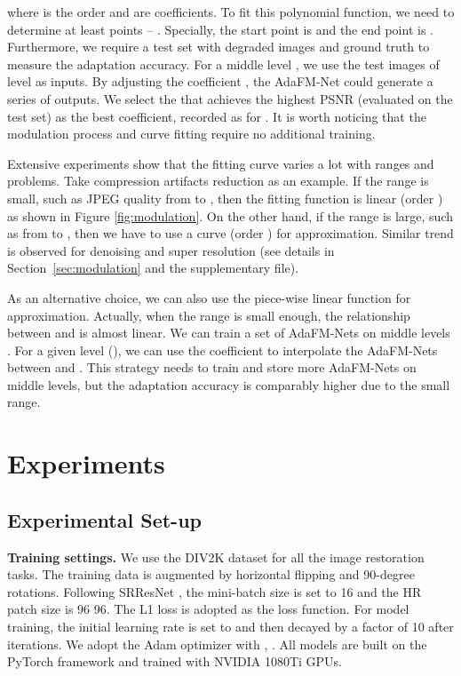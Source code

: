 \documentclass[10pt,twocolumn,letterpaper]{article}
\begin{document}
where  is the order and  are coefficients. To fit this polynomial function, we need to determine at least  points – . Specially, the start point is  and the end point is . Furthermore, we require a test set with degraded images and ground truth to measure the adaptation accuracy. For a middle level  , we use the test images of level  as inputs. By adjusting the coefficient , the AdaFM-Net could generate a series of outputs. We select the  that achieves the highest PSNR (evaluated on the test set) as the best coefficient, recorded as  for . It is worth noticing that the modulation process and curve fitting require no additional training.

Extensive experiments show that the fitting curve varies a lot with ranges and problems. Take compression artifacts reduction as an example. If the range is small, such as JPEG quality from  to , then the fitting function is linear (order ) as shown in Figure \ref{fig:modulation}. On the other hand, if the range is large, such as from  to , then we have to use a  curve (order ) for approximation. Similar trend is observed for denoising and super resolution (see details in Section~\ref{sec:modulation} and the supplementary file).

As an alternative choice, we can also use the piece-wise linear function for approximation. Actually, when the range is small enough, the relationship between  and  is almost linear. We can train a set of AdaFM-Nets on middle levels . For a given level  (), we can use the coefficient  to interpolate the AdaFM-Nets between  and . This strategy needs to train and store more AdaFM-Nets on middle levels, but the adaptation accuracy is comparably higher due to the small range. 

\section{Experiments}
\label{sec:exp}

\subsection{Experimental Set-up}

\textbf{Training settings.} 
We use the DIV2K \cite{agustsson2017ntire} dataset for all the image restoration tasks. The training data is augmented by horizontal flipping and 90-degree rotations. Following SRResNet \cite{ledig2017photo}, the mini-batch size is set to 16 and the HR patch size is 96  96. The L1 loss \cite{wang2018esrgan} is adopted as the loss function. For model training, the initial learning rate is set to  and then decayed by a factor of 10 after   iterations. We adopt the Adam \cite{Kingma2015AdamAM} optimizer with , . All models are built on the PyTorch framework and trained with NVIDIA 1080Ti GPUs.
\end{document}
